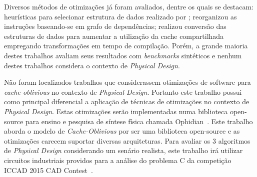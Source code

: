 Diversos métodos de otimizações já foram avaliados, dentre os quais se destacam:
heurísticas para selecionar estrutura de dados realizado por ;
 reorganizou as instruções baseando-se em grafo de dependências;
 realizou conversão das estruturas de dados para aumentar a utilização da cache compartilhada empregando transformações em tempo de compilação.
Porém, a grande maioria destes trabalhos avaliam seus resultados com \textit{benchmarks} sintéticos e nenhum destes trabalhos considera o contexto de \textit{Physical Design}.

Não foram localizados trabalhos que considerassem otimizações de software para \textit{cache-oblivious} no contexto de \textit{Physical Design}.
Portanto este trabalho possui como principal diferencial a aplicação de técnicas de otimizações no contexto de \textit{Physical Design}.
Estas otimizações serão implementadas numa biblioteca open-source para ensino e pesquisa de síntese física chamada Ophidian~\cite{ophidian}.
Este trabalho aborda o modelo de \textit{Cache-Oblivious} por ser uma biblioteca open-source e as otimizações carecem suportar diversas arquiteturas.
Para avaliar os 3 algoritmos de \textit{Physical Design} considerando um senário realista, este trabalho irá utilizar circuitos industriais providos para a análise do problema C da competição ICCAD 2015 CAD Contest~\cite{kim2015}.
